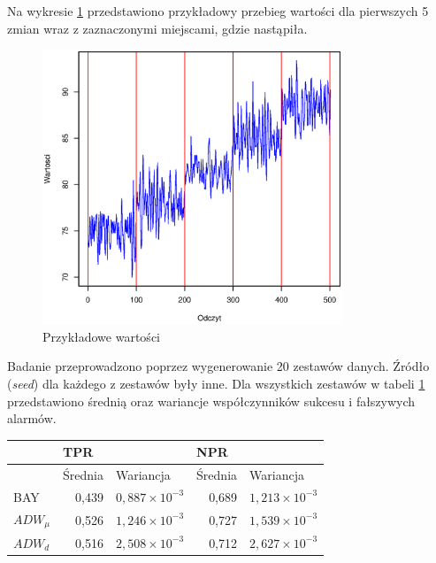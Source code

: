 Na wykresie \ref{fig:JumpingValues} przedstawiono przykładowy przebieg wartości dla pierwszych 5 zmian
wraz z zaznaczonymi miejscami,
gdzie nastąpiła.
\begin{figure}[htbp]
  \centering
  \includegraphics[width=0.8\textwidth]{img/ch-5-jumping}
  \caption{Przykładowe wartości}
  \label{fig:JumpingValues}
\end{figure}
Badanie przeprowadzono poprzez wygenerowanie 20 zestawów danych.
Źródło (\textit{seed}) dla każdego z zestawów były inne.
Dla wszystkich zestawów w tabeli \ref{tab:JumpingResult} przedstawiono średnią oraz wariancje współczynników sukcesu i fałszywych alarmów.
\begin{table}[h]
  \label{tab:JumpingResult}
  \centering
  \begin{tabular}{l r r r r}
    & \multicolumn{2}{l}{TPR} & \multicolumn{2}{l}{NPR} \\
    \hline
    & \multicolumn{1}{l}{Średnia} & \multicolumn{1}{l}{Wariancja}& \multicolumn{1}{l}{Średnia} & \multicolumn{1}{l}{Wariancja} \\
    \hline
    BAY & 0,439 & $0,887 \times 10^{-3}$ & 0,689 & $1,213 \times 10^{-3}$  \\
    $ADW_{\mu}$ & 0,526 & $1,246 \times 10^{-3}$ & 0,727 & $1,539 \times 10^{-3}$ \\
    $ADW_{d}$ & 0,516 & $2,508 \times 10^{-3}$ & 0,712 & $2,627 \times 10^{-3}$ \\
  \end{tabular}
\end{table}

